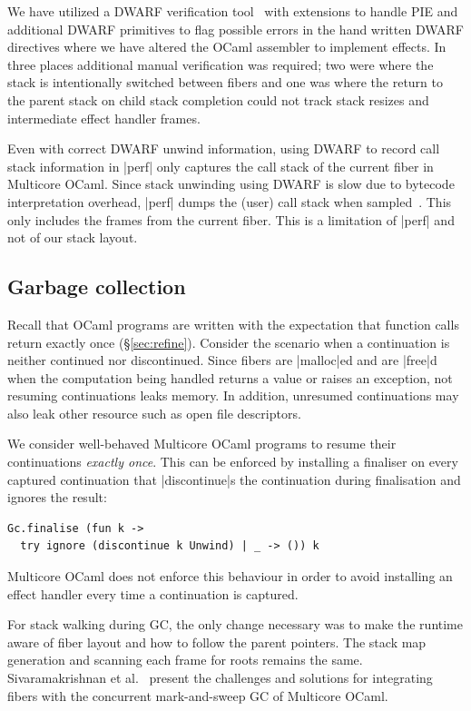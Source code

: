 \documentclass[sigplan,10pt,review,anonymous]{acmart}\settopmatter{printfolios=true,printccs=false,printacmref=false}
\begin{document}
We have utilized a DWARF verification tool~\cite{Bastian19} with extensions to
handle PIE and additional DWARF primitives to flag possible errors in the hand
written DWARF directives where we have altered the OCaml assembler to implement
effects. In three places additional manual verification was required; two were
where the stack is intentionally switched between fibers and one was where the
return to the parent stack on child stack completion could not track stack
resizes and intermediate effect handler frames.

Even with correct DWARF unwind information, using DWARF to record call stack
information in |perf| only captures the call stack of the current fiber in
Multicore OCaml. Since stack unwinding using DWARF is slow due to bytecode
interpretation overhead, |perf| dumps the (user) call stack when
sampled~\cite{Bastian19}. This only includes the frames from the current fiber.
This is a limitation of |perf| and not of our stack layout.

\vspace{-2mm}
\subsection{Garbage collection}

Recall that OCaml programs are written with the expectation that function calls
return exactly once (\S\ref{sec:refine}). Consider the scenario when a
continuation is neither continued nor discontinued. Since fibers are
|malloc|ed and are |free|d when the computation being handled returns a value
or raises an exception, not resuming continuations leaks memory. In addition,
unresumed continuations may also leak other resource such as open file
descriptors.

We consider well-behaved Multicore OCaml programs to resume their continuations
\emph{exactly once}. This can be enforced by installing a finaliser on every
captured continuation that |discontinue|s the continuation during finalisation
and ignores the result:
\begin{lstlisting}
Gc.finalise (fun k ->
  try ignore (discontinue k Unwind) | _ -> ()) k
\end{lstlisting}
Multicore OCaml does not enforce this behaviour in order to avoid installing an
effect handler every time a continuation is captured.

For stack walking during GC, the only change necessary was to make the runtime
aware of fiber layout and how to follow the parent pointers. The stack map
generation and scanning each frame for roots remains the same. Sivaramakrishnan
et al.~\cite{Sivaramakrishnan20} present the challenges and solutions for
integrating fibers with the concurrent mark-and-sweep GC of Multicore OCaml.
\end{document}
